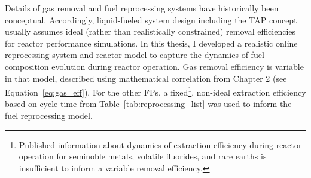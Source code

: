 Details of gas removal and fuel reprocessing systems have historically 
been conceptual. Accordingly, liquid-fueled system design including the 
\gls{TAP} concept usually assumes ideal (rather than realistically 
constrained) removal efficiencies for reactor performance simulations. In this 
thesis, I developed a realistic online reprocessing system and reactor model 
to capture the dynamics of fuel composition evolution during reactor 
operation. Gas removal efficiency is variable in that model, described using 
mathematical correlation from Chapter 2 (see Equation~\ref{eq:gas_eff}). For 
the other \glspl{FP}, a fixed\footnote{ 
	Published information about dynamics of extraction efficiency during 
	reactor 
	operation for seminoble metals, volatile fluorides, and rare earths is 
	insufficient to inform a variable removal efficiency.}, non-ideal 
extraction efficiency based on cycle time from  
Table~\ref{tab:reprocessing_list} was used to inform the fuel reprocessing 
model.

